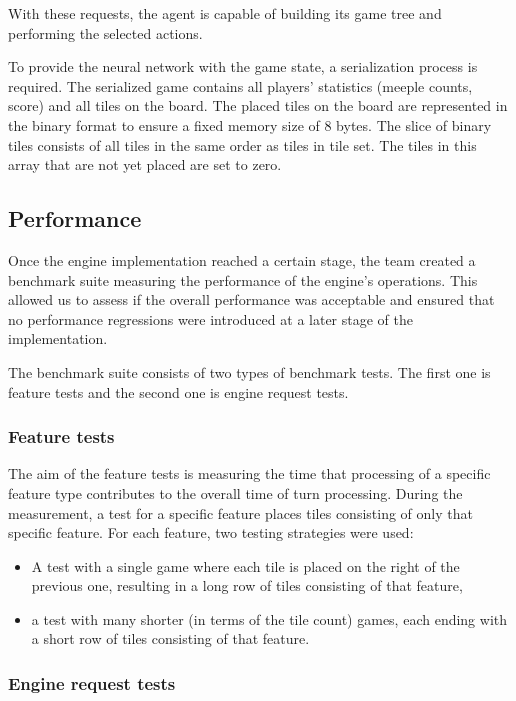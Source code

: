 With these requests, the agent is capable of building its game tree and performing the selected actions.

To provide the neural network with the game state, a serialization process is required. The serialized game contains all players' statistics (meeple counts, score) and all tiles on the board. The placed tiles on the board are represented in the binary format to ensure a fixed memory size of 8 bytes. The slice of binary tiles consists of all tiles in the same order as tiles in tile set. The tiles in this array that are not yet placed are set to zero.

\subsection{Performance}

Once the engine implementation reached a certain stage,
the team created a benchmark suite measuring the performance of the engine’s operations.
This allowed us to assess if the overall performance was acceptable and ensured that
no performance regressions were introduced at a later stage of the implementation.

The benchmark suite consists of two types of benchmark tests.
The first one is feature tests and the second one is engine request tests.


\subsubsection{Feature tests}

The aim of the feature tests is measuring the time that processing of
a specific feature type contributes to the overall time of turn processing.
During the measurement, a test for a specific feature places tiles consisting of
only that specific feature. For each feature, two testing strategies were used:
\begin{itemize}
	\item A test with a single game where each tile is placed on the right of the previous one,
          resulting in a long row of tiles consisting of that feature,
    \item a test with many shorter (in terms of the tile count) games,
          each ending with a short row of tiles consisting of that feature.
\end{itemize}

\subsubsection{Engine request tests}


